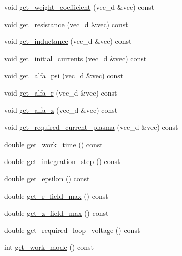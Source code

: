 \begin{DoxyCompactItemize}
void \hyperlink{class_plasma_lab_1_1_read_data_adfa0d1b481e3000fd9ec4984b7d4100f}{get\+\_\+weight\+\_\+coefficient} (vec\+\_\+d \&vec) const
\item 
void \hyperlink{class_plasma_lab_1_1_read_data_af4c5e230319f80f43117bc0deb1b9286}{get\+\_\+resistance} (vec\+\_\+d \&vec) const
\item 
void \hyperlink{class_plasma_lab_1_1_read_data_ad16bd5ea594f06932eb709f179e586b5}{get\+\_\+inductance} (vec\+\_\+d \&vec) const
\item 
void \hyperlink{class_plasma_lab_1_1_read_data_a9137f02d7904f2121c09386921a644e4}{get\+\_\+initial\+\_\+currents} (vec\+\_\+d \&vec) const
\item 
void \hyperlink{class_plasma_lab_1_1_read_data_acdbcf26ec214f62f3fe6992273c5e8c2}{get\+\_\+alfa\+\_\+psi} (vec\+\_\+d \&vec) const
\item 
void \hyperlink{class_plasma_lab_1_1_read_data_ae43f724b2b8f951b7a853ffe64ffbd45}{get\+\_\+alfa\+\_\+r} (vec\+\_\+d \&vec) const
\item 
void \hyperlink{class_plasma_lab_1_1_read_data_aba0b62c0133fdbc1d652f3937cc751d5}{get\+\_\+alfa\+\_\+z} (vec\+\_\+d \&vec) const
\item 
void \hyperlink{class_plasma_lab_1_1_read_data_a17e02dac99573cf6cd3cce1d5d381a0c}{get\+\_\+required\+\_\+current\+\_\+plasma} (vec\+\_\+d \&vec) const
\item 
double \hyperlink{class_plasma_lab_1_1_read_data_a86e2d9791886b7aa02d3c2551d211ceb}{get\+\_\+work\+\_\+time} () const
\item 
double \hyperlink{class_plasma_lab_1_1_read_data_a3378ef0a72c05a949023647c62feaf82}{get\+\_\+integration\+\_\+step} () const
\item 
double \hyperlink{class_plasma_lab_1_1_read_data_ae87a4c976fd74d8af2684e0545cac95e}{get\+\_\+epsilon} () const
\item 
double \hyperlink{class_plasma_lab_1_1_read_data_a2594acab4c4492fcfd8aa45b9836fe44}{get\+\_\+r\+\_\+field\+\_\+max} () const
\item 
double \hyperlink{class_plasma_lab_1_1_read_data_af83f850f05b3e800a574dadbddb453f4}{get\+\_\+z\+\_\+field\+\_\+max} () const
\item 
double \hyperlink{class_plasma_lab_1_1_read_data_abf6cf9dadaa1c32c7f2bd821c14a253a}{get\+\_\+required\+\_\+loop\+\_\+voltage} () const
\item 
int \hyperlink{class_plasma_lab_1_1_read_data_a5a8c0f760a96a5e745e402512e221304}{get\+\_\+work\+\_\+mode} () const
\item 

\end{DoxyCompactItemize}
